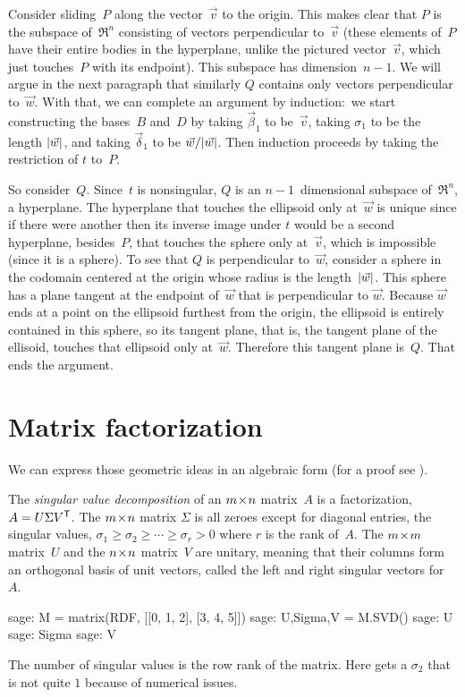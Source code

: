 Consider sliding~$P$ along the vector~$\vec{v}$ to the origin.
This makes clear that $P$ is the subspace of~$\Re^n$
consisting of vectors perpendicular
to~$\vec{v}$ (these elements of~$P$ have their
entire bodies in the hyperplane, 
unlike the pictured vector~$\vec{v}$, which just touches~$P$ with its endpoint).
This subspace has dimension~$n-1$. 
We will argue in the next paragraph 
that similarly $Q$ contains only
vectors perpendicular to~$\vec{w}$.
With that, we can complete an argument by induction:~we 
start constructing the 
bases~$B$ and~$D$ by taking $\vec{\beta}_1$ to be~$\vec{v}$, taking
$\sigma_1$ to be the length $\lvert\vec{w}\rvert$, and taking
$\vec{\delta}_1$ to be $\vec{w}/\lvert\vec{w}\rvert$.
Then induction proceeds by taking the restriction of $t$ to~$P$.

So consider~$Q$.
Since~$t$ is nonsingular, $Q$ is an $n-1$~dimensional subspace of~$\Re^n$,
a hyperplane.
The hyperplane that touches the ellipsoid
only at~$\vec{w}$ is unique since if there were another then its inverse image
under $t$
would be a second hyperplane, besides~$P$, 
that touches the sphere only at~$\vec{v}$, which is impossible (since it is a
sphere).
To see that $Q$ is perpendicular to~$\vec{w}$, consider a sphere in the codomain
centered at the origin whose radius is the length~$\lvert\vec{w}\rvert$.
This sphere has a plane tangent at the endpoint of~$\vec{w}$ 
that is perpendicular
to $\vec{w}$.
Because $\vec{w}$ ends at a point on the ellipsoid furthest from the origin,
the ellipsoid is entirely contained in this sphere, so its tangent plane,
that is, the tangent plane of the ellisoid,
touches that ellipsoid only at~$\vec{w}$.
Therefore
this tangent plane is~$Q$. 
That ends the argument.



\section{Matrix factorization}

We can express those geometric ideas in an algebraic form
(for a proof see \cite{TrefethenBau97}).

The \textit{singular value decomposition} of an $m \! \times \! n$ matrix~$A$
is a factorization, $A=U\Sigma {{V}^{\mathsf{T}}}$\!.
The $m \! \times \! n$ matrix $\Sigma$ 
is all zeroes except for diagonal entries, the singular values, 
$\sigma_1\geq \sigma_2 \geq \cdots \geq \sigma_r> 0$ where $r$ is the
rank of~$A$.
The $m \! \times \! m$ matrix~$U$ and the $n \! \times \! n$ matrix~$V$ are unitary, meaning
that their columns form an orthogonal basis of unit vectors, called 
the left and 
right singular vectors for~$A$. 
\begin{sagecommandline}
sage: M = matrix(RDF, [[0, 1, 2], [3, 4, 5]])
sage: U,Sigma,V = M.SVD()
sage: U
sage: Sigma
sage: V  
\end{sagecommandline}
The number of singular values is the row rank of the matrix.
Here \Sage{} gets a $\sigma_2$ that is not quite \( 1 \) because of numerical 
issues. 

